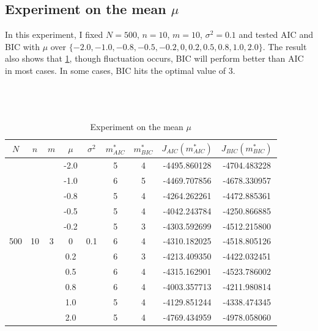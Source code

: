 \documentclass{article}
\begin{document}
\subsection{Experiment on the mean $\mu$}
In this experiment, I fixed $N=500$, $n=10$, $m=10$, $\sigma^2=0.1$ and tested AIC and BIC with $\mu$ over $\{-2.0, -1.0, -0.8, -0.5,-0.2, 0, 0.2, 0.5, 0.8, 1.0, 2.0\}$.
The result also shows that \ref{mu}, though fluctuation occurs, BIC will perform better than AIC in most cases. In some cases, BIC hits the optimal value of 3.
\\
\\
\\
\\
\begin{table}[htbp]
	\centering
	\newcommand{\tabincell}[2]{\begin{tabular}{@{}#1@{}}#2\end{tabular}}
	\renewcommand\arraystretch{1.0}
	\caption{Experiment on the mean $\mu$}
	\label{mu}%
	\begin{tabular}{c|c|c|c|c|c|c|c|c}
    $N$ & $n$ & $m$ & $\mu$ & $\sigma^2$ & $m^*_{AIC}$ & $m^*_{BIC}$ & $J_{AIC}(m^*_{AIC})$ &$J_{BIC}(m^*_{BIC})$\\
    \hline
		\multirow{11}{*}{500} & \multirow{11}{*}{10} & \multirow{11}{*}{3} & -2.0 & \multirow{11}{*}{0.1} & 5 & 4 & -4495.860128 & -4704.483228\\
     & & & -1.0 & & 6 & 5 & -4469.707856 & -4678.330957\\
     & & & -0.8 & & 5 & 4 & -4264.262261 & -4472.885361\\
     & & & -0.5 & & 5 & 4 & -4042.243784 & -4250.866885\\
     & & & -0.2 & & 5 & 3 & -4303.592699 & -4512.215800\\
     & & & 0 & & 6 & 4 & -4310.182025 & -4518.805126\\
     & & & 0.2 & & 6 & 3 & -4213.409350 & -4422.032451\\
     & & & 0.5 & & 6 & 4 & -4315.162901 & -4523.786002\\
     & & & 0.8 & & 6 & 4 & -4003.357713 & -4211.980814\\
     & & & 1.0 & & 5 & 4 & -4129.851244 & -4338.474345\\
     & & & 2.0 & & 5 & 4 & -4769.434959 & -4978.058060\\
		\hline
\end{tabular}
\end{table}
\end{document}

